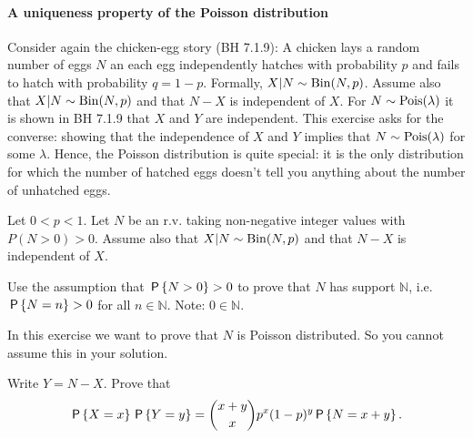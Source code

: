 \documentclass[../../assignments/assignments]{subfiles}
\begin{document}
\paragraph{A uniqueness property of the Poisson distribution}

Consider again the chicken-egg story (BH 7.1.9): A chicken lays a random number of eggs $N$ an each egg independently hatches with probability $p$ and fails to hatch with probability $q = 1-p$.
Formally, $X|N\sim\Bin{N,p}$.
Assume also that $X|N\sim\Bin{N,p}$ and that $N-X$ is independent of $X$.
For $N \sim \Pois{\lambda}$ it is shown in BH 7.1.9 that $X$ and $Y$ are independent.
This exercise asks for the converse: showing that the independence of $X$ and $Y$ implies that $N \sim \Pois{\lambda}$ for some $\lambda$.
Hence, the Poisson distribution is quite special: it is the only distribution for which the number of hatched eggs doesn't tell you anything about the number of unhatched eggs.

Let $0 < p < 1$. Let $N$ be an r.v. taking non-negative integer values with $P(N > 0) > 0$.
Assume also that  $X|N\sim\Bin{N,p}$ and that $N-X$ is independent of $X$.

\begin{exercise}
 Use the assumption that $\P{N>0}>0$ to prove that $N$ has support $\mathbb N$, i.e. $\P{N=n} > 0$ for all $n \in \mathbb N$. Note: $0 \in \mathbb N$.
\begin{hint}
In this exercise we want to prove that $N$ is Poisson distributed. So you cannot assume this in your solution.
\end{hint}
\end{exercise}

\begin{exercise}
Write $Y = N-X$. Prove that
\begin{equation}
\label{eq:1}
\P{X=x}\P{Y=y} = {x+y \choose x} p^x (1-p)^y \P{N=x+y}.
\end{equation}
\end{exercise}
\end{document}
